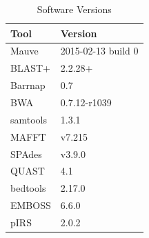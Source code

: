 \documentclass[10pt]{article}
\begin{document}
\begin{table}[]
  \centering
  \caption{Software Versions}
  \label{table:software}
  \begin{tabular}{ll}
    \toprule
    Tool & Version \\
    \midrule
    Mauve & 2015-02-13 build 0 \\
    BLAST+ & 2.2.28+ \\
    Barrnap & 0.7 \\
    BWA & 0.7.12-r1039 \\
    samtools & 1.3.1 \\
    MAFFT & v7.215 \\
    SPAdes & v3.9.0 \\
    QUAST & 4.1 \\
    bedtools & 2.17.0 \\
    EMBOSS & 6.6.0 \\
    pIRS & 2.0.2\\
    \bottomrule
  \end{tabular}
\end{table}

\pagebreak
\end{document}
